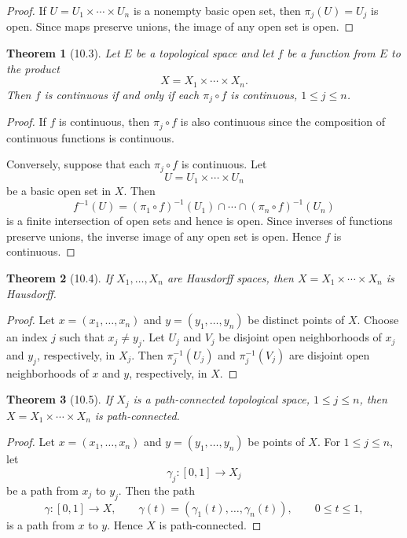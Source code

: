 \documentclass[12pt]{article}
\newtheorem{theorem}{Theorem}
\begin{document}
\begin{proof}
If $U=U_1\times\cdots\times U_n$ is a nonempty basic open set, then $\pi_j(U)=U_j$ is open. Since maps preserve unions, the image of any open set is open.
\end{proof}

\begin{theorem}[10.3]
Let $E$ be a topological space and let $f$ be a function from $E$ to the product
\[
X=X_1\times\cdots\times X_n.
\]
Then $f$ is continuous if and only if each $\pi_j\circ f$ is continuous, $1\le j\le n$.
\end{theorem}

\begin{proof}
If $f$ is continuous, then $\pi_j\circ f$ is also continuous since the composition of continuous functions is continuous.

Conversely, suppose that each $\pi_j\circ f$ is continuous. Let
\[
U=U_1\times\cdots\times U_n
\]
be a basic open set in $X$. Then
\[
f^{-1}(U)=(\pi_1\circ f)^{-1}(U_1)\cap\cdots\cap(\pi_n\circ f)^{-1}(U_n)
\]
is a finite intersection of open sets and hence is open. Since inverses of functions preserve unions, the inverse image of any open set is open. Hence $f$ is continuous.
\end{proof}

\begin{theorem}[10.4]
If $X_1,\dots,X_n$ are Hausdorff spaces, then $X=X_1\times\cdots\times X_n$ is Hausdorff.
\end{theorem}

\begin{proof}
Let $x=(x_1,\dots,x_n)$ and $y=(y_1,\dots,y_n)$ be distinct points of $X$. Choose an index $j$ such that $x_j\ne y_j$. Let $U_j$ and $V_j$ be disjoint open neighborhoods of $x_j$ and $y_j$, respectively, in $X_j$. Then $\pi_j^{-1}(U_j)$ and $\pi_j^{-1}(V_j)$ are disjoint open neighborhoods of $x$ and $y$, respectively, in $X$.
\end{proof}

\begin{theorem}[10.5]
If $X_j$ is a path-connected topological space, $1\le j\le n$, then $X=X_1\times\cdots\times X_n$ is path-connected.
\end{theorem}

\begin{proof}
Let $x=(x_1,\dots,x_n)$ and $y=(y_1,\dots,y_n)$ be points of $X$. For $1\le j\le n$, let
\[
\gamma_j:[0,1]\to X_j
\]
be a path from $x_j$ to $y_j$. Then the path
\[
\gamma:[0,1]\to X,\qquad
\gamma(t)=(\gamma_1(t),\dots,\gamma_n(t)),\qquad 0\le t\le 1,
\]
is a path from $x$ to $y$. Hence $X$ is path-connected.
\end{proof}
\end{document}
